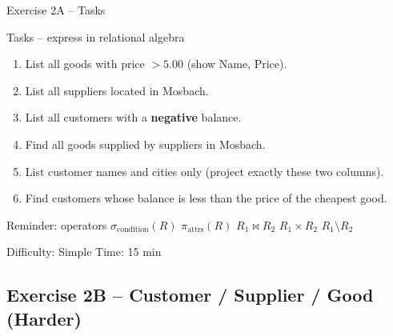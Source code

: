 \documentclass[10pt]{beamer}
\begin{document}
\begin{frame}{Exercise 2A -- Tasks}
  \begin{block}{Tasks -- express in relational algebra}
    \begin{enumerate}
      \item List all goods with price $> 5.00$ (show Name, Price).
      \item List all suppliers located in Mosbach.
      \item List all customers with a \textbf{negative} balance.
      \item Find all goods supplied by suppliers in Mosbach.
      \item List customer names and cities only (project exactly these two columns).
      \item Find customers whose balance is less than the price of the cheapest good.
    \end{enumerate}
  \end{block}

  \begin{block}{Reminder: operators}
    $\sigma_{\text{condition}}(R)$ \quad
    $\pi_{\text{attrs}}(R)$ \quad
    $R_1 \bowtie R_2$ \quad
    $R_1 \times R_2$ \quad
    $R_1 \setminus R_2$
  \end{block}

  \begin{alertblock}{Difficulty: Simple \quad Time: 15 min}
  \end{alertblock}
\end{frame}

\subsection{Exercise 2B -- Customer / Supplier / Good (Harder)}
\end{document}
